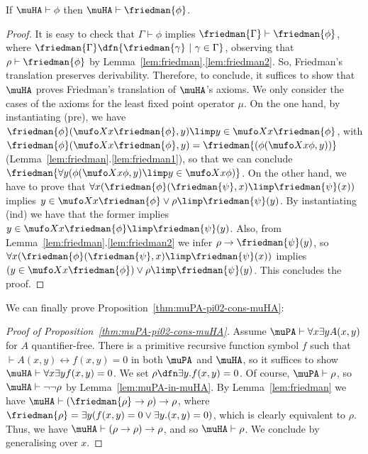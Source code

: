 \begin{lemma}
If $\muHA \vdash \phi$ then $\muHA \vdash \friedman{\phi}$.
\end{lemma}
\begin{proof}
       It is easy to check that $\Gamma \vdash \phi$ implies $\friedman{\Gamma}\vdash \friedman{\phi}$, where $\friedman{\Gamma}\dfn\{\friedman{\gamma} \ \vert \ \gamma \in \Gamma\}$, observing that $\rho \vdash \friedman{\phi}$ by Lemma~\ref{lem:friedman}.\ref{lem:friedman2}. So, Friedman's translation preserves derivability. Therefore, to conclude, it suffices to show that $\muHA$ proves Friedman's translation of $\muHA$'s axioms. We only consider the cases of the axioms for the least fixed point operator $\mu$.  On the one hand, by instantiating (pre), we have $\friedman{\phi}(\mufo X x \friedman{\phi}, y) \limp y \in \mufo X x \friedman{\phi}$, with $\friedman{\phi}(\mufo X x \friedman{\phi}, y)= \friedman{(\phi(\mufo X x\phi, y))}$ (Lemma~\ref{lem:friedman}.\ref{lem:friedman1}), so that we can conclude  $\friedman{\forall y (\phi(\mufo X x \phi, y) \limp y \in \mufo X x \phi)}$. On the other hand, we have to prove that $\forall x (\friedman{\phi}(\friedman{\psi}, x) \limp \friedman{\psi}(x)) $ implies $y \in \mufo X x \friedman{\phi} \vee \rho  \limp \friedman{\psi}(y)$.  By instantiating (ind) we have that the former implies $y \in \mufo X x \friedman{\phi}   \limp \friedman{\psi}(y)$. Also, from Lemma~\ref{lem:friedman}.\ref{lem:friedman2} we infer $\rho \to \friedman{\psi}(y)$, so $\forall x (\friedman{\phi}(\friedman{\psi}, x) \limp \friedman{\psi}(x))$ implies $(y \in \mufo X x \friedman{\phi}) \vee \rho  \limp \friedman{\psi}(y)$. This concludes the proof.
\end{proof}

We can finally prove Proposition~\ref{thm:muPA-pi02-cons-muHA}:

\begin{proof}[Proof of Proposition~\ref{thm:muPA-pi02-cons-muHA}]
Assume $\muPA \vdash \forall x\exists yA(x,y)$ for $A$ quantifier-free.  There is a primitive recursive function symbol $f$ such that $\vdash A(x,y)\leftrightarrow f(x,y)=0$ in both $\muPA$ and $\muHA$, so it suffices to show $\muHA \vdash \forall x\exists yf(x,y)=0$. We set $\rho\dfn \exists y .f(x,y)=0$.  Of course, $\muPA \vdash \rho$, so $\muHA \vdash \neg \neg \rho$ by Lemma~\ref{lem:muPA-in-muHA}. By Lemma~\ref{lem:friedman} we have  $\muHA \vdash (\friedman{\rho}\to \rho) \to \rho$, where $\friedman{\rho}= \exists y(f(x,y)=0 \vee \exists y.(x,y)=0)$, which is clearly equivalent to $\rho$. Thus, we have $\muHA \vdash (\rho\to \rho)\to \rho$, and so $\muHA\vdash \rho$. We conclude by generalising over $x$.
\end{proof}




       